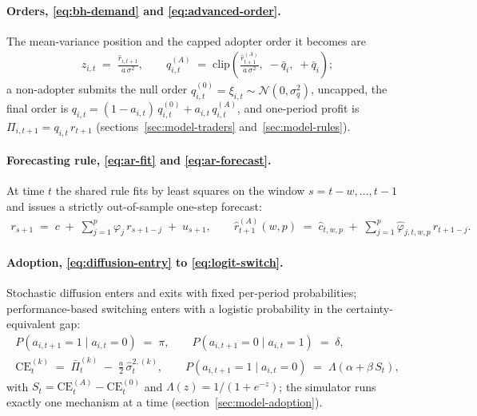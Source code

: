 \documentclass[12pt]{article}
\begin{document}
\paragraph{Orders, \eqref{eq:bh-demand} and \eqref{eq:advanced-order}.}
The mean-variance position and the capped adopter order it becomes are
\begin{gather*}
  z_{i,t} \;=\; \frac{\hat{r}_{i,t+1}}{a\, \sigma^{2}}, \qquad
  q_{i,t}^{(A)} \;=\; \mathrm{clip}\!\left(\frac{\hat{r}_{t+1}^{(A)}}{a\, \sigma^{2}},\; -\bar{q}_{i},\; +\bar{q}_{i}\right);
\end{gather*}
a non-adopter submits the null order $q_{i,t}^{(0)} = \xi_{i,t} \sim \mathcal{N}(0, \sigma_{q}^{2})$, uncapped, the final order is $q_{i,t} = (1 - a_{i,t})\, q_{i,t}^{(0)} + a_{i,t}\, q_{i,t}^{(A)}$, and one-period profit is $\Pi_{i,t+1} = q_{i,t}\, r_{t+1}$ (sections~\ref{sec:model-traders} and~\ref{sec:model-rules}).

\paragraph{Forecasting rule, \eqref{eq:ar-fit} and \eqref{eq:ar-forecast}.}
At time $t$ the shared rule fits by least squares on the window $s = t - w, \ldots, t - 1$ and issues a strictly out-of-sample one-step forecast:
\begin{gather*}
  r_{s+1} \;=\; c \;+\; \sum_{j=1}^{p} \varphi_{j}\, r_{s+1-j} \;+\; u_{s+1}, \qquad
  \hat{r}_{t+1}^{(A)}(w, p) \;=\; \hat{c}_{t, w, p} \;+\; \sum_{j=1}^{p} \hat{\varphi}_{j, t, w, p}\, r_{t+1-j}.
\end{gather*}

\paragraph{Adoption, \eqref{eq:diffusion-entry} to \eqref{eq:logit-switch}.}
Stochastic diffusion enters and exits with fixed per-period probabilities; performance-based switching enters with a logistic probability in the certainty-equivalent gap:
\begin{gather*}
  P(a_{i,t+1} = 1 \mid a_{i,t} = 0) \;=\; \pi, \qquad
  P(a_{i,t+1} = 0 \mid a_{i,t} = 1) \;=\; \delta,\\
  \mathrm{CE}_t^{(k)} \;=\; \bar{\Pi}_t^{(k)} \;-\; \tfrac{a}{2}\, \hat{\sigma}_{t}^{2,(k)}, \qquad
  P(a_{i,t+1} = 1 \mid a_{i,t} = 0) \;=\; \Lambda(\alpha + \beta\, S_t),
\end{gather*}
with $S_t = \mathrm{CE}_t^{(A)} - \mathrm{CE}_t^{(0)}$ and $\Lambda(z) = 1/(1 + e^{-z})$; the simulator runs exactly one mechanism at a time (section~\ref{sec:model-adoption}).
\end{document}
